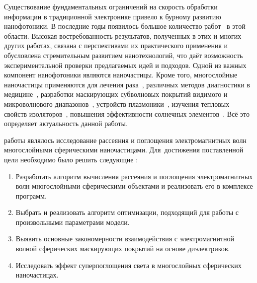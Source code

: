 {\actuality} Существование фундаментальных ограничений на скорость
обработки информации в традиционной электронике привело к бурному
развитию нанофотоники. В последние годы появилось большое количество
работ~\cite{Tame-quantum-plasmonics-2013,
  Javier-graphene-plasmonics-2014, Khurgin-loss-plasmonics-2015,
  He-tunable-terahertz-graphene-metamaterials-2015,
  Segal-meta-nonlinar-PhC-2015,
  Poddubny-hyperbolic-metamaterials-2013, Kildishev-metasurface-2013}
в этой области.  Высокая востребованность результатов, полученных в
этих и многих других работах, связана с перспективами их практического
применения и обусловлена стремительным развитием нанотехнологий, что
даёт возможность экспериментальной проверки предлагаемых идей и
подходов. Одной из важных компонент нанофотоники являются наночастицы.
Кроме того, многослойные наночастицы применяются для лечения
рака~\cite{Zhang-2010, Hirsch-2003}, различных методов диагностики в
медицине~\cite{Allain-2002}, разработки маскирующих субволновых
покрытий видимого и микроволнового диапазонов~\cite{Qui-2009,
  Semouchkina-2013}, устройств плазмоники~\cite{Martin-2013,
  Alu-2005}, изучения тепловых свойств изоляторов~\cite{Xie-2013},
повышения эффективности солнечных элементов~\cite{Kameya-2011,
  Mann-2011}.  Всё это определяет актуальность данной работы.

{\aim} работы являлось %
исследование рассеяния и поглощения электромагнитных волн многослойными
сферическими наночастицами.
Для~достижения поставленной цели необходимо было решить следующие {\tasks}:
\begin{enumerate}
  \item Разработать алгоритм вычисления рассеяния и поглощения
    электромагнитных волн
    многослойными сферическими объектами и реализовать его в комплексе программ.
  \item Выбрать и реализовать алгоритм оптимизации, подходящий для
    работы с произвольными параметрами модели.%
  \item Выявить основные закономерности взаимодействия с
    электромагнитной волной сферических маскирующих покрытий на
    основе диэлектриков.
  \item Исследовать эффект суперпоглощения света в многослойных
    сферических наночастицах.
\end{enumerate}

